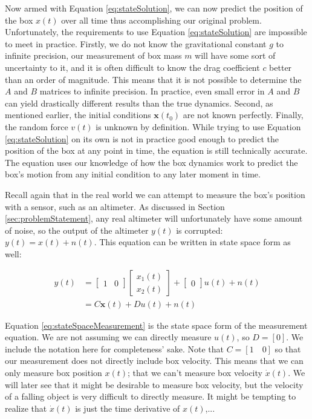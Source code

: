 \documentclass{article}
\begin{document}
Now armed with Equation \ref{eq:stateSolution}, we can now predict the position of the box $x(t)$ over all time thus accomplishing our original problem.  Unfortunately, the requirements to use Equation \ref{eq:stateSolution} are impossible to meet in practice.  Firstly, we do not know the gravitational constant $g$ to infinite precision, our measurement of box mass $m$ will have some sort of uncertainty to it, and it is often difficult to know the drag coefficient $c$ better than an order of magnitude.  This means that it is not possible to determine the $A$ and $B$ matrices to infinite precision.  In practice, even small error in $A$ and $B$ can yield drastically different results than the true dynamics.  Second, as mentioned earlier, the initial conditions $\pmb{x}(t_0)$ are not known perfectly.  Finally, the random force $v(t)$ is unknown by definition.  While trying to use Equation \ref{eq:stateSolution} on its own is not in practice good enough to predict the position of the box at any point in time, the equation is still technically accurate.  The equation uses our knowledge of how the box dynamics work to predict the box's motion from any initial condition to any later moment in time.

Recall again that in the real world we can attempt to measure the box's position with a sensor, such as an altimeter.  As discussed in Section \ref{sec:problemStatement}, any real altimeter will unfortunately have some amount of noise, so the output of the altimeter $y(t)$ is corrupted: $y(t)=x(t)+n(t)$.  This equation can be written in state space form as well:

\begin{align}
\label{eq:stateSpaceMeasurement}
y(t)&= \begin{bmatrix} 1 & 0 \end{bmatrix}\begin{bmatrix} x_1(t) \\ x_2(t)\end{bmatrix}+\begin{bmatrix}0\end{bmatrix} u(t)+n(t)\nonumber\\
&=C\pmb{x}(t)+Du(t)+n(t)
\end{align}

Equation \ref{eq:stateSpaceMeasurement} is the state space form of the measurement equation.  We are not assuming we can directly measure $u(t)$, so $D=[0]$.  We include the notation here for completeness' sake.  Note that $C=[1 \quad 0]$ so that our measurement does not directly include box velocity.  This means that we can only measure box position $x(t)$; that we can't measure box velocity $\dot{x}(t)$.  We will later see that it might be desirable to measure box velocity, but the velocity of a falling object is very difficult to directly measure.  It might be tempting to realize that $\dot{x}(t)$ is just the time derivative of $x(t)$,...
\end{document}
